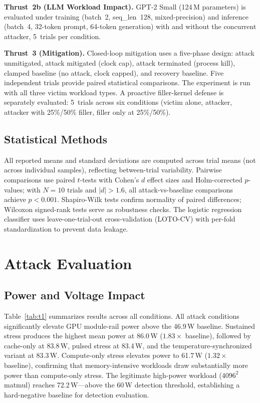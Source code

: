 \documentclass[letterpaper,twocolumn,10pt]{article}
\begin{document}
\textbf{Thrust~2b (LLM Workload Impact).}
GPT-2 Small (124\,M parameters) is evaluated under training
(batch~2, seq\_len~128, mixed-precision) and inference (batch~4,
32-token prompt, 64-token generation) with and without the
concurrent attacker, 5~trials per condition.

\textbf{Thrust~3 (Mitigation).}
Closed-loop mitigation uses a five-phase design: attack unmitigated,
attack mitigated (clock cap), attack terminated (process kill),
clamped baseline (no attack, clock capped), and recovery baseline.
Five independent trials provide paired statistical comparisons.
The experiment is run with all three victim workload types.
A proactive filler-kernel defense is separately evaluated:
5~trials across six conditions (victim alone, attacker, attacker
with 25\%/50\% filler, filler only at 25\%/50\%).

\subsection{Statistical Methods}
\label{sec:stats}

All reported means and standard deviations are computed across trial
means (not across individual samples), reflecting between-trial
variability.  Pairwise comparisons use paired $t$-tests with Cohen's
$d$ effect sizes and Holm-corrected $p$-values; with $N = 10$ trials
and $|d| > 1.6$, all attack-vs-baseline comparisons achieve
$p < 0.001$.  Shapiro-Wilk tests confirm normality of paired
differences; Wilcoxon signed-rank tests serve as robustness checks.
The logistic regression classifier uses leave-one-trial-out
cross-validation (LOTO-CV) with per-fold standardization to prevent
data leakage.


\section{Attack Evaluation}
\label{sec:eval-attack}

\subsection{Power and Voltage Impact}
\label{sec:eval-power}

Table~\ref{tab:t1} summarizes results across all conditions.
All attack conditions significantly elevate GPU module-rail power
above the 46.9\,W baseline.  Sustained stress produces the highest
mean power at 86.0\,W ($1.83\times$ baseline), followed by
cache-only at 83.8\,W, pulsed stress at 83.4\,W, and the
temperature-synchronized variant at 83.3\,W.  Compute-only stress
elevates power to 61.7\,W ($1.32\times$ baseline), confirming that
memory-intensive workloads draw substantially more power than
compute-only stress.  The legitimate high-power workload ($4096^2$
matmul) reaches 72.2\,W---above the 60\,W detection threshold,
establishing a hard-negative baseline for detection evaluation.
\end{document}
